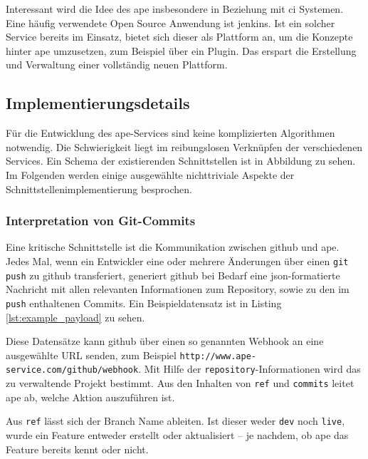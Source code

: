 Interessant wird die Idee des \gls{ape} insbesondere in Beziehung mit \gls{ci} Systemen. Eine häufig verwendete Open Source Anwendung ist \gls{jenkins}. Ist ein solcher Service bereits im Einsatz, bietet sich dieser als Plattform an, um die Konzepte hinter \gls{ape} umzusetzen, zum Beispiel über ein Plugin. Das erspart die Erstellung und Verwaltung einer vollständig neuen Plattform.


\subsection{Implementierungsdetails} %
\label{sub:implementierungsdetails}

Für die Entwicklung des \gls{ape}-Services sind keine komplizierten Algorithmen notwendig. Die Schwierigkeit liegt im reibungslosen Verknüpfen der verschiedenen Services. Ein Schema der existierenden Schnittstellen ist in Abbildung zu sehen. Im Folgenden werden einige ausgewählte nichttriviale Aspekte der Schnittstellenimplementierung besprochen.

\subsubsection{Interpretation von Git-Commits} %
\label{ssub:interpretation_von_git_commits}

Eine kritische Schnittstelle ist die Kommunikation zwischen \gls{github} und \gls{ape}. Jedes Mal, wenn ein Entwickler eine oder mehrere Änderungen über einen \lstinline!git push! zu \gls{github} transferiert, generiert \gls{github} bei Bedarf eine \gls{json}-formatierte Nachricht mit allen relevanten Informationen zum Repository, sowie zu den im \lstinline!push! enthaltenen Commits. Ein Beispieldatensatz ist in Listing \ref{lst:example_payload} zu sehen.

Diese Datensätze kann \gls{github} über einen so genannten Webhook an eine ausgewählte URL senden, zum Beispiel \lstinline!http://www.ape-service.com/github/webhook!. Mit Hilfe der \lstinline!repository!-Informationen wird das zu verwaltende Projekt bestimmt. Aus den Inhalten von \lstinline!ref! und \lstinline!commits! leitet \gls{ape} ab, welche Aktion auszuführen ist.

Aus \lstinline!ref! lässt sich der Branch Name ableiten. Ist dieser weder \lstinline!dev! noch \lstinline!live!, wurde ein Feature entweder erstellt oder aktualisiert -- je nachdem, ob \gls{ape} das Feature bereits kennt oder nicht.

